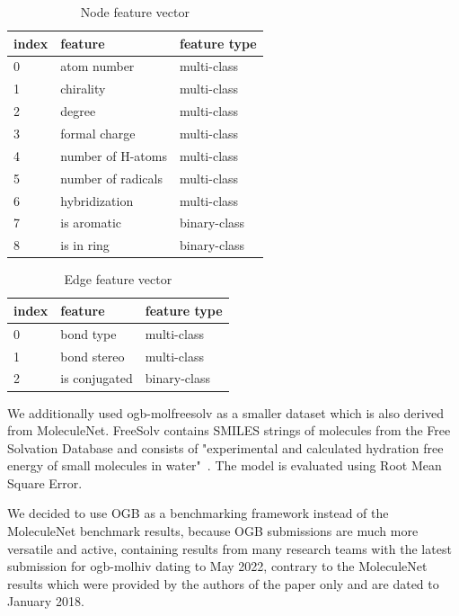 \begin{table}[h!]
    \centering
    \begin{tabular}{lll} %
        \toprule
        index & feature            & feature type \\ \midrule
        0     & atom number        & multi-class  \\
        1     & chirality          & multi-class  \\
        2     & degree             & multi-class  \\
        3     & formal charge      & multi-class  \\
        4     & number of H-atoms  & multi-class  \\
        5     & number of radicals & multi-class  \\
        6     & hybridization      & multi-class  \\
        7     & is aromatic        & binary-class \\
        8     & is in ring         & binary-class \\ \bottomrule
    \end{tabular}
    \caption{Node feature vector}
    \label{node_feature_list}
\end{table}

\begin{table}[h!]
    \centering
    \begin{tabular}{lll}
        \toprule
        index & feature       & feature type \\\midrule
        0     & bond type     & multi-class  \\
        1     & bond stereo   & multi-class  \\
        2     & is conjugated & binary-class \\\bottomrule
    \end{tabular}
    \caption{Edge feature vector}
    \label{edge_features}
\end{table}


We additionally used ogb-molfreesolv as a smaller dataset which is also derived from MoleculeNet. FreeSolv contains SMILES strings of molecules from the Free Solvation Database and consists of "experimental and calculated hydration free energy of small molecules in water"~\cite{2018moleculenet}. The model is evaluated using Root Mean Square Error.

We decided to use OGB as a benchmarking framework instead of the MoleculeNet benchmark results, because OGB submissions are much more versatile and active, containing results from many research teams with the latest submission for ogb-molhiv dating to May 2022, contrary to the MoleculeNet results which were provided by the authors of the paper only and are dated to January 2018.

